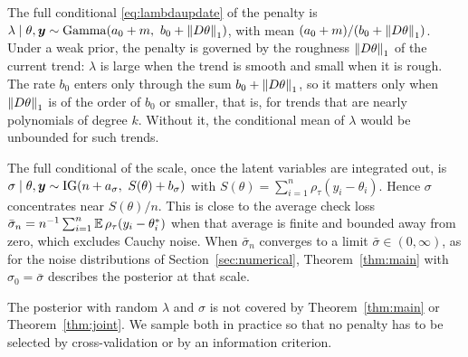 The full conditional \eqref{eq:lambdaupdate} of the penalty is $\lambda\mid\theta,\by\sim\mathrm{Gamma}(a_0+m,\ b_0+\norm{D\theta}_1)$, with mean $(a_0+m)/(b_0+\left\lVert D\theta\right\rVert_1)$. Under a weak prior, the penalty is governed by the roughness $\left\lVert D\theta\right\rVert_1$ of the current trend: $\lambda$ is large when the trend is smooth and small when it is rough. The rate $b_0$ enters only through the sum $b_0+\left\lVert D\theta\right\rVert_1$, so it matters only when $\left\lVert D\theta\right\rVert_1$ is of the order of $b_0$ or smaller, that is, for trends that are nearly polynomials of degree $k$. Without it, the conditional mean of $\lambda$ would be unbounded for such trends.

The full conditional of the scale, once the latent variables are integrated out, is $\sigma\mid\theta,\by\sim\mathrm{IG}(n+a_\sigma,\ S(\theta)+b_\sigma)$ with $S(\theta)=\sum_{i=1}^n\rho_\tau(y_i-\theta_i)$. Hence $\sigma$ concentrates near $S(\theta)/n$. This is close to the average check loss $\bar\sigma_n=n^{-1}\sum_{i=1}^n\mathbb{E}\,\rho_\tau(y_i-\theta^{*}_i)$ when that average is finite and bounded away from zero, which excludes Cauchy noise. When $\bar\sigma_n$ converges to a limit $\bar\sigma\in(0,\infty)$, as for the noise distributions of Section~\ref{sec:numerical}, Theorem~\ref{thm:main} with $\sigma_0=\bar\sigma$ describes the posterior at that scale.

The posterior with random $\lambda$ and $\sigma$ is not covered by Theorem~\ref{thm:main} or Theorem~\ref{thm:joint}. We sample both in practice so that no penalty has to be selected by cross-validation or by an information criterion.
